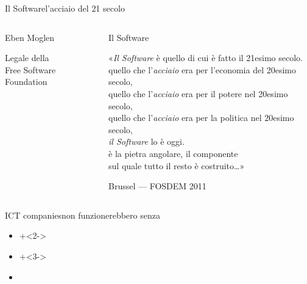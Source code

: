 \documentclass[italian,compress,red]{beamer}
\begin{document}
\begin{frame}{Il Software}{l'acciaio del {21\textdegree} secolo}
  \begin{columns}[T]
  \begin{column}{.3\textwidth}
    \begin{block}{Eben Moglen}
      \begin{center}
      \end{center}
      \vfill
      \begin{tiny}Legale della \\ Free Software Foundation\end{tiny}\\
    \end{block}

  \end{column} 
  \begin{column}{.7\textwidth}
    \begin{exampleblock}{Il Software}
      \begin{scriptsize}
      
	«\emph{Il Software} è quello di cui è fatto il 21esimo secolo. \\
	quello che l'\emph{acciaio} era per l'economia del 20esimo secolo, \\
	quello che l'\emph{acciaio} era per il potere nel 20esimo secolo, \\
	quello che l'\emph{acciaio} era per la politica nel 20esimo secolo, \\
	\emph{il Software} lo è oggi. \\
	è la pietra angolare, il componente \\ 
	sul quale tutto il resto è costruito\ldots» \\
      \end{scriptsize}
      \vfill
      \begin{tiny} Brussel --- FOSDEM 2011 \end{tiny}
      
    \end{exampleblock}   
  \end{column}
  \end{columns}

\end{frame}

\begin{frame}{ICT companies}{non funzionerebbero senza}
\begin{itemize}
  \onslide+<1-> \item {}
  \onslide+<2-> \item {}
  \onslide+<3-> \item {}
 \end{itemize}

\end{frame}
\end{document}
